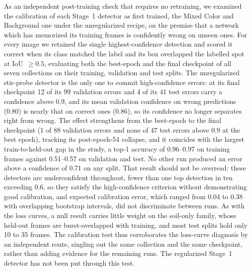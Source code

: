 ﻿\documentclass[journal]{IEEEtran}
\begin{document}
As an independent post-training check that requires no retraining, we examined the calibration of each Stage~1 detector as first trained, the Mixed Color and Background one under the unregularized recipe, on the premise that a network which has memorized its training frames is confidently wrong on unseen ones. For every image we retained the single highest-confidence detection and scored it correct when its class matched the label and its box overlapped the labelled spot at IoU~$\geq 0.5$, evaluating both the best-epoch and the final checkpoint of all seven collections on their training, validation and test splits. The unregularized stir-probe detector is the only one to commit high-confidence errors: at its final checkpoint 12 of its 99 validation errors and 4 of its 41 test errors carry a confidence above 0.9, and its mean validation confidence on wrong predictions (0.80) is nearly that on correct ones (0.86), so its confidence no longer separates right from wrong. The effect strengthens from the best-epoch to the final checkpoint (1 of 88 validation errors and none of 47 test errors above 0.9 at the best epoch), tracking its post-epoch-54 collapse, and it coincides with the largest train-to-held-out gap in the study, a top-1 accuracy of 0.96--0.97 on training frames against 0.51--0.57 on validation and test. No other run produced an error above a confidence of 0.71 on any split. That result should not be overread: these detectors are underconfident throughout, fewer than one top detection in ten exceeding 0.6, so they satisfy the high-confidence criterion without demonstrating good calibration, and expected calibration error, which ranged from 0.04 to 0.38 with overlapping bootstrap intervals, did not discriminate between runs. As with the loss curves, a null result carries little weight on the soil-only family, whose held-out frames are burst-overlapped with training, and most test splits hold only 10 to 35 frames. The calibration test thus corroborates the loss-curve diagnosis by an independent route, singling out the same collection and the same checkpoint, rather than adding evidence for the remaining runs. The regularized Stage~1 detector has not been put through this test.
\end{document}

